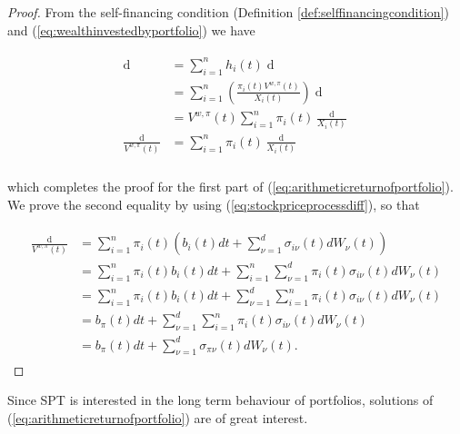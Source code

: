 \documentclass[british]{amsart} \usepackage{lmodern}
\numberwithin{equation}{section} \numberwithin{figure}{section}
\theoremstyle{plain} \newtheorem{thm}{\protect\theoremname}[section]
\theoremstyle{definition} \newtheorem{defn}[thm]{\protect\definitionname}
\theoremstyle{plain} \newtheorem{assumption}[thm]{\protect\assumptionname}
\theoremstyle{plain} \newtheorem{lem}[thm]{\protect\lemmaname}
\theoremstyle{plain} \newtheorem{prop}[thm]{\protect\propositionname}
\theoremstyle{remark} \newtheorem{rem}[thm]{\protect\remarkname}
\theoremstyle{plain} \newtheorem{cor}[thm]{\protect\corollaryname}
\renewcommand{\d}[1]{\mathop{\mathrm{d}{#1}}}
\begin{document}
\begin{proof}

  From the self-financing condition (Definition \ref{def:selffinancingcondition}) 
  and (\ref{eq:wealthinvestedbyportfolio}) we have

  \begin{gather*}
    \begin{split}
      \d{V^{w,\pi}(t)} 
      &= \sum_{i=1}^{n} h_{i}(t) \d{X_{i}(t)} \\
      &= \sum_{i=1}^{n} \left(  \frac{\pi_{i}(t)V^{w,\pi}(t)}{X_{i}(t)} \right) \d{X_{i}(t)} \\
      &= V^{w,\pi}(t) \sum_{i=1}^{n} \pi_{i}(t) \frac{\d{X_{i}(t)}}{X_{i}(t)} \\
      \frac{\d{V^{w,\pi}(t)}}{V^{w,\pi}(t)} 
      &= \sum_{i=1}^{n} \pi_{i}(t) \frac{\d{X_{i}(t)}}{X_{i}(t)} \\
    \end{split}
  \end{gather*}

   which completes the proof for the first part of (\ref{eq:arithmeticreturnofportfolio}). 
  We prove the second equality by using (\ref{eq:stockpriceprocessdiff}), so that
  
  \begin{gather*}
    \begin{split}
      \frac{\d{V^{w,\pi}(t)}}{V^{w,\pi}(t)}
          & = \sum_{i=1}^{n} \pi_{i}(t) 
          \left(
            b_{i}(t)dt + \sum_{\nu=1}^{d} \sigma_{i\nu}(t) dW_{\nu}(t)
          \right) \\
          & = \sum_{i=1}^{n} \pi_{i}(t) b_{i}(t)dt + 
              \sum_{i=1}^{n} \sum_{\nu=1}^{d} \pi_{i}(t) \sigma_{i\nu}(t) dW_{\nu}(t) \\
          & = \sum_{i=1}^{n} \pi_{i}(t) b_{i}(t)dt + 
              \sum_{\nu=1}^{d} \sum_{i=1}^{n} \pi_{i}(t) \sigma_{i\nu}(t) dW_{\nu}(t) \\
          & = b_{\pi}(t)dt + 
              \sum_{\nu=1}^{d} \sum_{i=1}^{n} \pi_{i}(t) \sigma_{i\nu}(t) dW_{\nu}(t) \\
          & = b_{\pi}(t)dt + 
              \sum_{\nu=1}^{d} \sigma_{\pi\nu}(t) dW_{\nu}(t).
    \end{split}
  \end{gather*}

\end{proof}

Since SPT is interested in the long term behaviour of portfolios, solutions of
(\ref{eq:arithmeticreturnofportfolio}) are of great interest. 
\end{document}

